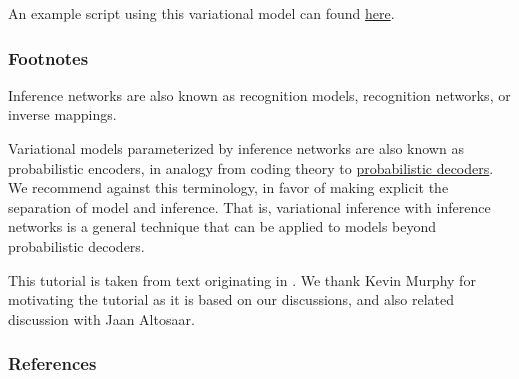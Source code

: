 An example script using this variational model can found
\href{https://github.com/blei-lab/edward/blob/master/examples/vae.py}
{here}.

\subsubsection{Footnotes}

Inference networks are also known as recognition models, recognition
networks, or inverse mappings.

Variational models parameterized by
inference networks are also known as probabilistic encoders, in
analogy from coding theory to
\href{decoder}{probabilistic decoders}.
We recommend against this terminology,
in favor of making explicit the separation of model and inference.
That is,
variational inference with inference networks is a
general technique that can be applied to models beyond
probabilistic decoders.

This tutorial is taken from text originating in \citet{tran2016variational}.
We thank Kevin Murphy for motivating the tutorial as it is based
on our discussions, and also related discussion with Jaan Altosaar.

\subsubsection{References}\label{references}

